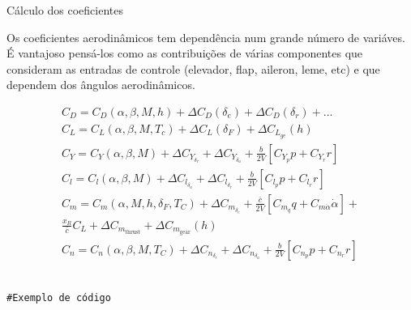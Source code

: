 \documentclass{beamer}
\newcommand{\jindent}{\justifying\setlength{\parindent}{1.5em}}
\begin{document}
\begin{frame}{Cálculo dos coeficientes}

    \jindent
    Os coeficientes aerodinâmicos tem dependência num grande número de variáves. É vantajoso pensá-los como as contribuições de várias componentes que consideram as entradas de controle (elevador, flap, aileron, leme, etc) e que dependem dos ângulos aerodinâmicos.

    \begin{gather*}
        C_D = C_D(\alpha, \beta, M, h) + \Delta C_D(\delta_e) + \Delta C_D(\delta_r) + \dots \\
        C_L = C_L(\alpha, \beta, M, T_c) + \Delta C_L(\delta_F) + \Delta C_{L_{ge}}(h) \\
        C_Y = C_Y(\alpha, \beta, M) + \Delta C_{Y_{\delta_r}} + \Delta C_{Y_{\delta_a}} + \frac{b}{2V} \left[ C_{Y_p}p + C_{Y_r}r\right]\\
        C_l = C_l(\alpha, \beta, M) + \Delta C_{l_{\delta_a}} + \Delta C_{l_{\delta_r}} + \frac{b}{2V}[C_{l_p}p + C_{l_r}r] \\
        C_m = C_m(\alpha, M, h, \delta_F, T_C) + \Delta C_{m_{\delta_e}} + \frac{\bar c}{2V}[C_{m_q}q + C_{m{\dot \alpha}}\dot \alpha] + \\ \frac{x_R}{\bar c}C_L + \Delta C_{m_{\text{thrust}}} + \Delta C_{m_\text{gear}}(h) \\
        C_n = C_n(\alpha, \beta, M, T_C) + \Delta C_{n_{\delta_r}} + \Delta C_{n_{\delta_a}} + \frac{b}{2V}[C_{n_p}p + C_{n_r}r]
    \end{gather*}
    
\end{frame}



\begin{frame}[fragile]{}
\begin{verbatim}

#Exemplo de código

\end{verbatim}
\end{frame}

\end{document}
